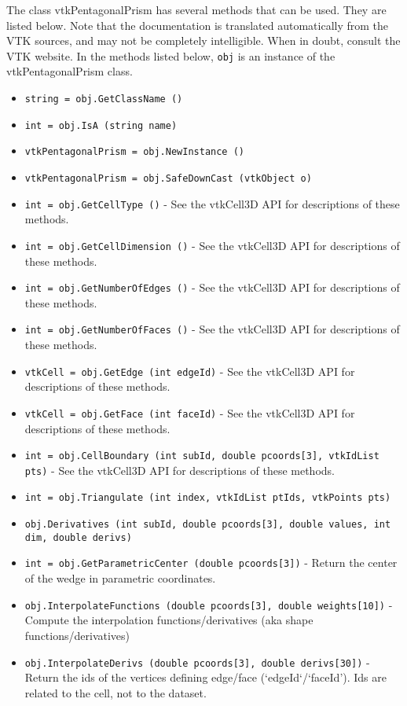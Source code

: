 The class vtkPentagonalPrism has several methods that can be used.
  They are listed below.
Note that the documentation is translated automatically from the VTK sources,
and may not be completely intelligible.  When in doubt, consult the VTK website.
In the methods listed below, \verb|obj| is an instance of the vtkPentagonalPrism class.
\begin{itemize}
\item  \verb|string = obj.GetClassName ()|

\item  \verb|int = obj.IsA (string name)|

\item  \verb|vtkPentagonalPrism = obj.NewInstance ()|

\item  \verb|vtkPentagonalPrism = obj.SafeDownCast (vtkObject o)|

\item  \verb|int = obj.GetCellType ()| -  See the vtkCell3D API for descriptions of these methods.

\item  \verb|int = obj.GetCellDimension ()| -  See the vtkCell3D API for descriptions of these methods.

\item  \verb|int = obj.GetNumberOfEdges ()| -  See the vtkCell3D API for descriptions of these methods.

\item  \verb|int = obj.GetNumberOfFaces ()| -  See the vtkCell3D API for descriptions of these methods.

\item  \verb|vtkCell = obj.GetEdge (int edgeId)| -  See the vtkCell3D API for descriptions of these methods.

\item  \verb|vtkCell = obj.GetFace (int faceId)| -  See the vtkCell3D API for descriptions of these methods.

\item  \verb|int = obj.CellBoundary (int subId, double pcoords[3], vtkIdList pts)| -  See the vtkCell3D API for descriptions of these methods.

\item  \verb|int = obj.Triangulate (int index, vtkIdList ptIds, vtkPoints pts)|

\item  \verb|obj.Derivatives (int subId, double pcoords[3], double values, int dim, double derivs)|

\item  \verb|int = obj.GetParametricCenter (double pcoords[3])| -  Return the center of the wedge in parametric coordinates.

\item  \verb|obj.InterpolateFunctions (double pcoords[3], double weights[10])| -  Compute the interpolation functions/derivatives
 (aka shape functions/derivatives)

\item  \verb|obj.InterpolateDerivs (double pcoords[3], double derivs[30])| -  Return the ids of the vertices defining edge/face (`edgeId`/`faceId').
 Ids are related to the cell, not to the dataset.

\end{itemize}
